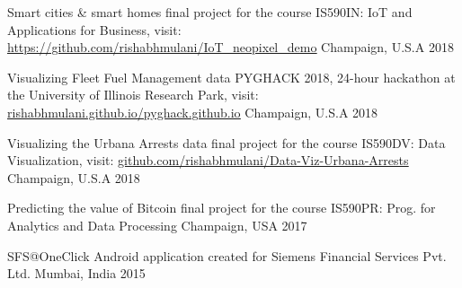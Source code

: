 {\vspace{-2mm}}



\begin{cvhonors}

  \cvhonor
    {Smart cities \& smart homes} %
    {final project for the course IS590IN: IoT and Applications for Business, visit: \underline{\hyperlink{https://github.com/rishabhmulani/IoT_neopixel_demo}{https://github.com/rishabhmulani/IoT\_neopixel\_demo}}} %
    {Champaign, U.S.A} %
    {2018} %

  \cvhonor
    {Visualizing Fleet Fuel Management data} %
    {PYGHACK 2018, 24-hour hackathon at the University of Illinois Research Park, visit: \underline{\hyperlink{rishabhmulani.github.io/pyghack.github.io}{rishabhmulani.github.io/pyghack.github.io}}} %
    {Champaign, U.S.A} %
    {2018} %

  \cvhonor
    {Visualizing the Urbana Arrests data} %
    {final project for the course IS590DV: Data Visualization, visit: \underline{\hyperlink{https://github.com/rishabhmulani/Data-Viz-Urbana-Arrests}{github.com/rishabhmulani/Data-Viz-Urbana-Arrests}}} %
    {Champaign, U.S.A} %
    {2018} %

  \cvhonor
    {Predicting the value of Bitcoin} %
    {final project for the course IS590PR: Prog. for Analytics and Data Processing} %
    {Champaign, USA} %
    {2017} %

  \cvhonor
    {SFS@OneClick} %
    {Android application created for Siemens Financial Services Pvt. Ltd.} %
    {Mumbai, India} %
    {2015} %

\end{cvhonors}
\vspace{-3.7mm}